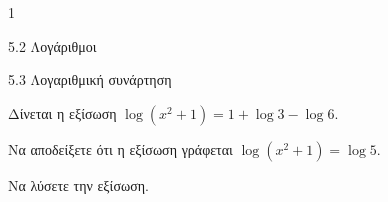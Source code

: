 \begin{ylh}{1}
\item 5.2 Λογάριθμοι
\item 5.3 Λογαριθμική συνάρτηση
\end{ylh}
Δίνεται η εξίσωση $\log(x^2 + 1) = 1 + \log 3 - \log 6$.
\begin{alist}
\item Να αποδείξετε ότι η εξίσωση γράφεται $\log(x^2 + 1) = \log 5$.
\item Να λύσετε την εξίσωση.
\end{alist}

